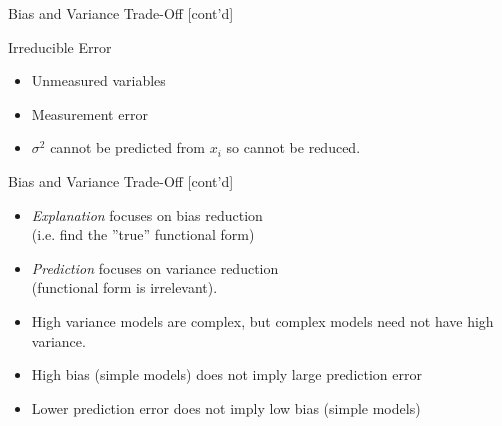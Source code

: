\documentclass[ignorenonframetext,xcolor=x11names]{beamer}
\begin{document}
\begin{frame}[label=full]{Bias and Variance Trade-Off \small [cont'd]}
\begin{block}{Irreducible Error}
  \begin{itemize}
     \item Unmeasured variables
     \item Measurement error
     \item $\sigma^2$ cannot be predicted from $x_i$ so cannot be reduced.
  \end{itemize}
\end{block}
\end{frame}

\begin{frame}[label=full]{Bias and Variance Trade-Off \small [cont'd]}
\begin{itemize}
  \item \emph{Explanation} focuses on bias reduction \\(i.e. find the ''true'' functional form)
  \item \emph{Prediction} focuses on variance reduction \\(functional form is irrelevant).
  \item High variance models are complex, but complex models need not have high variance.
  \item High bias (simple models) does not imply large prediction error
  \item Lower prediction error does not imply low bias (simple models)
\end{itemize}
\end{frame}

\end{document}
